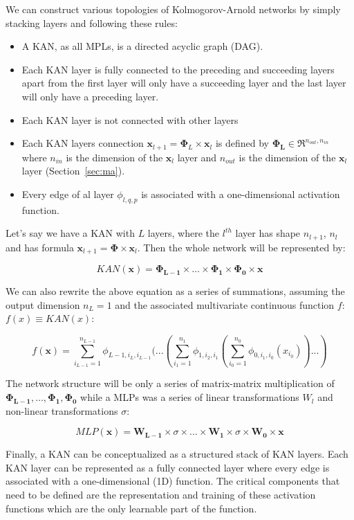 \documentclass[12pt,a4paper]{article}
\begin{document}
We can construct various topologies of Kolmogorov-Arnold networks by simply stacking layers and following these rules:
\begin{itemize}
    \item A KAN, as all MPLs, is a directed acyclic graph (DAG). 
    \item Each KAN layer is fully connected to the preceding and succeeding layers apart from the first layer will only have a succeeding layer and the last layer will only have a preceding layer.
    \item Each KAN layer is not connected with other layers
    \item Each KAN layers connection $\textbf{x}_{l+1} = \boldsymbol{\Phi}_L \times \textbf{x}_l$ is defined by $\boldsymbol{\Phi_{L}} \in \Re^{n_{out},n_{in}}$ where $n_{in}$ is the dimension of the $\textbf{x}_l$ layer and $n_{out}$ is the dimension of the $\textbf{x}_l$ layer (Section~\ref{sec:ma}).
    \item Every edge of al layer $\phi_{l,q,p}$ is associated with a one-dimensional activation function. 
\end{itemize}

Let’s say we have a KAN with $L$ layers, where the $l^{th}$ layer has shape $n_{l+1}$, $n_l$ and has formula $\textbf{x}_{l+1} = \boldsymbol{\Phi} \times \textbf{x}_l $. Then the whole network will be represented by:

$$KAN(\textbf{x}) = \boldsymbol{\Phi_{L-1}} \times \dots \times \boldsymbol{\Phi_{1}} \times \boldsymbol{\Phi_{0}} \times \textbf{x}$$

We can also rewrite the above equation as a series of summations, assuming the output dimension $n_L = 1$ and the associated multivariate
continuous function $f$:  $f(x) \equiv KAN(x)$:

$$f(\textbf{x}) = \sum_{i_{L-1}=1}^{n_{L-1}}  \phi_{L-1,i_L,i_{L-1}} (...(\sum_{i_1=1}^{n_{1}}  \phi_{1,i_2,i_{1}}(\sum_{i_0=1}^{n_{0}}  \phi_{0,i_1,i_{0}}(x_{i_0}))...)$$

The network structure will be only a series of matrix-matrix multiplication of $ \boldsymbol{\Phi_{L-1}}, \dots, \boldsymbol{\Phi_{1}},\boldsymbol{\Phi_{0}}$  while a MLPs was a series of linear transformations $W_l$ and non-linear transformations $\sigma$:

$$MLP(\textbf{x}) = \boldsymbol{W_{L-1}} \times \sigma \times \dots \times \boldsymbol{W_{1}} \times \sigma \times\boldsymbol{W_{0}} \times \textbf{x}$$

Finally, a KAN can be conceptualized as a structured stack of KAN layers. Each KAN layer can be represented as a fully connected layer where every edge is associated with a one-dimensional (1D) function. The critical components that need to be defined are the representation and training of these activation functions which are the only learnable part of the function.
\end{document}
